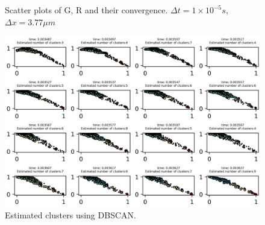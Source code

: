 \documentclass[a4paper,12pt]{article}
\begin{document}
\begin{figure}[!ht]
     \hfill
     \caption{Scatter plots of G, R and their convergence. $\Delta t = 1\times 10^{-5} s$, $\Delta x = 3.77 \mu m$}
     \label{fig:Ech}
   \end{figure}
   
 \begin{figure}[h]
\centering
\includegraphics[width=1.1\linewidth]{./figures/clusters_GR.png}
\caption{ Estimated clusters using DBSCAN. }
\end{figure}







\end{document}
